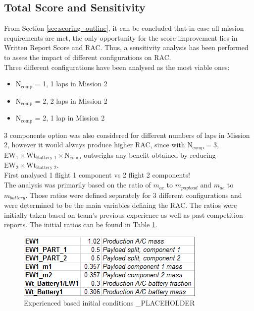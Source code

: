 \subsection{Total Score and Sensitivity}

From Section \ref{sec:scoring_outline}, it can be concluded that in case all mission requirements are met, the only opportunity for the score improvement lies in Written Report Score and RAC. Thus, a sensitivity analysis has been performed to asses the impact of different configurations on RAC.\\

Three different configurations have been analysed as the most viable ones: 
\begin{itemize}
    \item $\text{N}_{\text{comp}}$ = 1, 1 laps in Mission 2
    \item $\text{N}_{\text{comp}}$ = 2, 2 laps in Mission 2
    \item $\text{N}_{\text{comp}}$ = 2, 1 lap in Mission 2
\end{itemize}

3 components option was also considered for different numbers of laps in Mission 2, however it would always produce higher RAC, since with $\text{N}_{\text{comp}} = 3$,  $\text{EW}_{1} \times \text{Wt}_{\textrm{Battery 1}} \times \text{N}_{\text{comp}}$ outweighs any benefit obtained by reducing $\text{EW}_{2} \times \text{Wt}_{\textrm{Battery 2}}$.\\

First analysed 1 flight 1 component vs 2 flight 2 components!\\


The analysis was primarily based on the ratio of $m_{{ac}}$ to $m_{payload}$ and $m_{{ac}}$ to $m_{battery}$. Those ratios were defined separately for 3 different configurations and were determined to be the main variables defining the RAC. The ratios were initially taken based on team's previous experience as well as past competition reports. The initial ratios can be found in Table \ref{fig:sens_constants}. \\

\begin{figure}[!h]
    \centering
    \includegraphics{sens_constants}
    \caption{Experienced based initial conditions \_PLACEHOLDER }
    \label{fig:sens_constants}
\end{figure}

